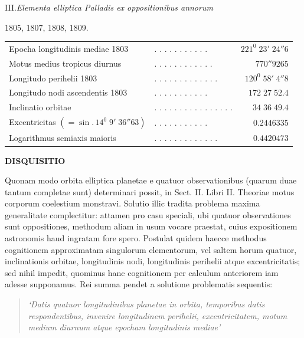 \begin{center}III.\quad\textit{Elementa elliptica Palladis ex oppositionibus annorum}\par
1805, 1807, 1808, 1809.\end{center}
\begingroup\small\setlength{\tabcolsep}{2pt}
\noindent\begin{tabular}{@{}p{.51\linewidth}lr@{}}
Epocha longitudinis mediae 1803&. . . . . . . . . . .&$221^0\;23'\;24''6$\\
Motus medius tropicus diurnus&. . . . . . . . . . . .&$770''9265$\\
Longitudo perihelii 1803&. . . . . . . . . . . . .&$120^0\;58'\;4''8$\\
Longitudo nodi ascendentis 1803&. . . . . . . . . . .&$172\;27\;52.4$\\
Inclinatio orbitae&. . . . . . . . . . . . . . . .&$34\;36\;49.4$\\
Excentricitas $(=\sin.\,14^0\;9'\;36''63)$&. . . . . . . . . . .&$0.2446335$\\
Logarithmus semiaxis maioris&. . . . . . . . . . . . .&$0.4420473$
\end{tabular}\par\endgroup
\clearpage
\thispagestyle{empty}
\noindent{}%
%
\parbox[t]{\dimexpr\linewidth-24mm\relax}{\centering\footnotesize\bfseries DISQUISITIO\par}%
\makebox[12mm][r]{}\par\nobreak\medskip
{}
Quonam modo orbita elliptica planetae e quatuor observationibus (quarum duae tantum completae sunt) determinari possit, in Sect. II. Libri II. Theoriae motus corporum coelestium monstravi. Solutio illic tradita problema maxima generalitate complectitur: attamen pro casu speciali, ubi quatuor observationes sunt oppositiones, methodum aliam in usum vocare praestat, cuius expositionem astronomis haud ingratam fore spero. Postulat quidem haecce methodus cognitionem approximatam singulorum elementorum, vel saltem horum quatuor, inclinationis orbitae, longitudinis nodi, longitudinis perihelii atque excentricitatis; sed nihil impedit, quominus hanc cognitionem per calculum anteriorem iam adesse supponamus. Rei summa pendet a solutione problematis sequentis:
\begin{quote}\itshape
‘Datis quatuor longitudinibus planetae in orbita, temporibus datis respondentibus, invenire longitudinem perihelii, excentricitatem, motum medium diurnum atque epocham longitudinis mediae’
\end{quote}
